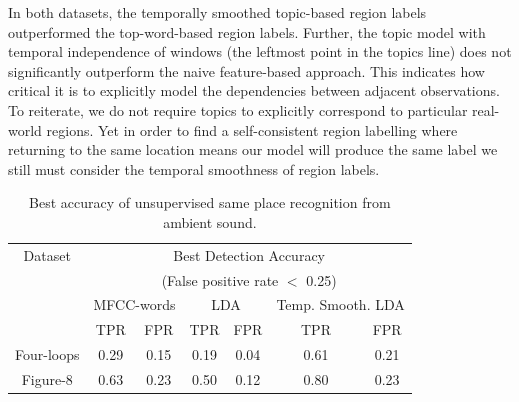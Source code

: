 In both datasets, the temporally smoothed topic-based region labels outperformed the top-word-based region labels. Further, the topic model with temporal independence of windows (the leftmost point in the topics line) does not significantly outperform the naive feature-based approach. This indicates how critical it is to explicitly model the dependencies between adjacent observations. To reiterate, we do not require topics to explicitly correspond to particular real-world regions. Yet in order to find a self-consistent region labelling where returning to the same location means our model will produce the same label we still must consider the temporal smoothness of region labels.

\begin{table}
    \centering
    \begin{tabular}{|c|c|c|c|c|c|c|}
    \hline
    Dataset & \multicolumn{6}{|c|}{Best Detection Accuracy}\\
    & \multicolumn{6}{|c|}{(False positive rate $<$ 0.25)}\\ \cline{2-7}
    &\multicolumn{2}{|c|}{MFCC-words}& \multicolumn{2}{|c|}{LDA}&\multicolumn{2}{|c|}{Temp. Smooth. LDA}\\
    \hline
    &TPR& FPR&TPR& FPR&~~ TPR ~~& FPR\\
    \hline
    Four-loops & 0.29 &0.15 & 0.19 & 0.04 & 0.61 & 0.21\\
    \hline
    Figure-8 & 0.63 & 0.23 & 0.50 & 0.12 & 0.80 & 0.23\\
    \hline
    \end{tabular}
    
    \caption{Best accuracy of unsupervised same place recognition from ambient sound.}
    \label{tab:audio-results-summary}
\end{table}
